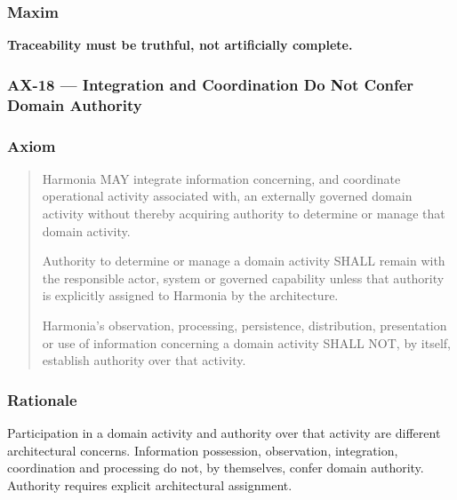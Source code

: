 \label{rad:axioms:870}
\subsubsection*{Maxim}
\label{rad:axioms:872}

\textbf{Traceability must be truthful, not artificially complete.}

\label{rad:axioms:874}



\label{rad:axioms:876}
\subsubsection*{AX-18 — Integration and Coordination Do Not Confer Domain Authority}
\label{rad:axioms:878}
\subsubsection*{Axiom}
\label{rad:axioms:880}

\begin{quote}

Harmonia MAY integrate information concerning, and coordinate operational activity associated with, an externally governed domain activity without thereby acquiring authority to determine or manage that domain activity.


Authority to determine or manage a domain activity SHALL remain with the responsible actor, system or governed capability unless that authority is explicitly assigned to Harmonia by the architecture.


Harmonia's observation, processing, persistence, distribution, presentation or use of information concerning a domain activity SHALL NOT, by itself, establish authority over that activity.


\end{quote}
\label{rad:axioms:886}
\subsubsection*{Rationale}
\label{rad:axioms:888}

Participation in a domain activity and authority over that activity are different architectural concerns. Information possession, observation, integration, coordination and processing do not, by themselves, confer domain authority. Authority requires explicit architectural assignment.

